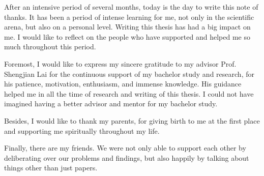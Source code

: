 
After an intensive period of several months, today is the day to write this note of thanks. It has been a period of intense learning for me, not only in the scientific arena, but also on a personal level. Writing this thesis has had a big impact on me. I would like to reflect on the people who have supported and helped me so much throughout this period.

Foremost, I would like to express my sincere gratitude to my advisor Prof. Shengjian Lai for the continuous support of my bachelor study and research, for his patience, motivation, enthusiasm, and immense knowledge. His guidance helped me in all the time of research and writing of this thesis. I could not have imagined having a better advisor and mentor for my bachelor study.

Besides, I would like to thank my parents, for giving birth to me at the first place and supporting me spiritually throughout my life.

Finally, there are my friends. We were not only able to support each other by deliberating over our problems and findings, but also happily by talking about things other than just papers.